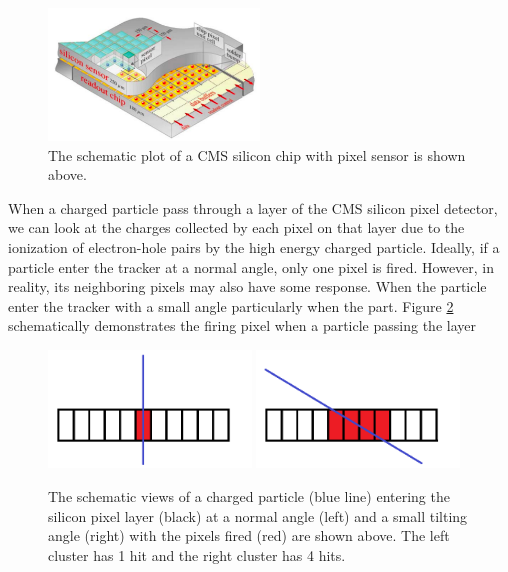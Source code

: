 \begin{figure}[hbtp]
\begin{center}
\includegraphics[width=0.50\textwidth]{Figures/Chapter3/CMSPixChip.png}
\caption{The schematic plot of a CMS silicon chip with pixel sensor is shown above.}
\label{CMSPixChip}
\end{center}
\end{figure} 

When a charged particle pass through a layer of the CMS silicon pixel detector, we can look at the charges collected by each pixel on that layer due to the ionization of electron-hole pairs by the high energy charged particle. Ideally, if a particle enter the tracker at a normal angle, only one pixel is fired. However, in reality, its neighboring pixels may also have some response. When the particle enter the tracker with a small angle  particularly when the part. Figure \ref{HitDemo} schematically demonstrates the firing pixel when a particle passing the layer

\begin{figure}[hbtp]
\begin{center}
\includegraphics[width=0.48\textwidth]{Figures/Chapter3/Hit1.png}
\includegraphics[width=0.48\textwidth]{Figures/Chapter3/Hit2.png}
\caption{The schematic views of a charged particle (blue line) entering the silicon pixel layer (black) at a normal angle (left) and a small tilting angle (right) with the pixels fired (red) are shown above. The left cluster has 1 hit and the right cluster has 4 hits.}
\label{HitDemo}
\end{center}
\end{figure} 


